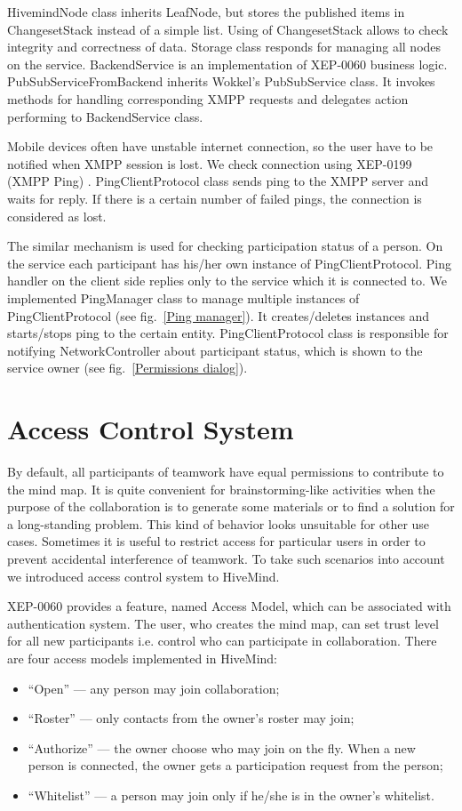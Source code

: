 HivemindNode class inherits LeafNode, but stores the published items in
ChangesetStack instead of a simple list. Using of ChangesetStack allows to check
integrity and correctness of data. Storage class responds for managing all nodes
on the service. BackendService is an implementation of XEP-0060 business logic.
PubSubServiceFromBackend inherits Wokkel's PubSubService class. It invokes
methods for handling corresponding XMPP requests and delegates action performing
to BackendService class.

Mobile devices often have unstable internet connection, so the user have to be
notified when XMPP session is lost. We check connection using XEP-0199 (XMPP
Ping) \cite{ping-xep-0199}. PingClientProtocol class sends ping to the XMPP
server and waits for reply. If there is a certain number of failed pings, the
connection is considered as lost.

The similar mechanism is used for checking participation status of a person. On
the service each participant has his/her own instance of PingClientProtocol. Ping
handler on the client side replies only to the service which it is connected
to. We implemented PingManager class to manage multiple instances of
PingClientProtocol (see fig.~\ref{Ping manager}).  It creates/deletes instances
and starts/stops ping to the certain entity. PingClientProtocol class is
responsible for notifying NetworkController about participant status, which is
shown to the service owner (see fig.~\ref{Permissions dialog}).

\section{Access Control System}
\label{Access control system}

By default, all participants of teamwork have equal permissions to contribute to
the mind map. It is quite convenient for brainstorming-like activities when the
purpose of the collaboration is to generate some materials or to find a solution
for a long-standing problem. This kind of behavior looks unsuitable for other
use cases. Sometimes it is useful to restrict access for particular users in
order to prevent accidental interference of teamwork. To take such scenarios
into account we introduced access control system to HiveMind.

XEP-0060 provides a feature, named Access Model, which can be associated with
authentication system. The user, who creates the mind map, can set trust level
for all new participants i.e. control who can participate in collaboration.
There are four access models implemented in HiveMind:
\begin{itemize}
\item ``Open'' --- any person may join collaboration;
\item ``Roster'' --- only contacts from the owner’s roster may join;
\item ``Authorize'' --- the owner choose who may join on the fly. When a new
  person is connected, the owner gets a participation request from the person;
\item ``Whitelist'' --- a person may join only if he/she is in the owner’s
  whitelist.
\end{itemize}

